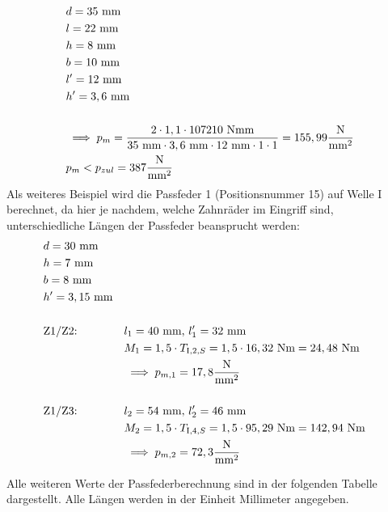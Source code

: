 \begin{itemize}
\begin{align*}
		&d= 35 \text{ mm} \\
		&l= 22 \text{ mm} \\
		&h= 8 \text{ mm} \\
		&b= 10 \text{ mm} \\
		&l'= 12 \text{ mm} \\
		&h'= 3,6 \text{ mm} \\ \\
		&\implies p_m = \frac{2 \cdot 1,1 \cdot 107210 \text{ Nmm}}{35 \text{ mm} \cdot 3,6 \text{ mm} \cdot 12 \text{ mm} \cdot 1 \cdot 1}  = 155,99 \frac{\text{N}}{\text{mm}^2}\\
		& p_m < p_{zul} = 387 \frac{\text{N}}{\text{mm}^2} \\
	\end{align*}
	Als weiteres Beispiel wird die Passfeder 1 (Positionsnummer 15) auf Welle I berechnet, da hier je nachdem, welche Zahnräder im Eingriff sind, unterschiedliche Längen der Passfeder beansprucht werden:
	\begin{align*}
	&d= 30 \text{ mm} &\\
	&h= 7 \text{ mm} &\\
	&b= 8 \text{ mm} &\\
	&h'= 3,15 \text{ mm}& \\ \\
	&\text{Z1/Z2:} &&l_1 = 40 \text{ mm, } l_1' = 32 \text{ mm}\\
	& && M_1 = 1,5 \cdot T_{\mathord{\mathrm{I}},2,S} = 1,5 \cdot 16,32 \text{ Nm} =24,48 \text{ Nm} \\
	& &&\implies p_{m,1} = 17,8\frac{\text{N}}{\text{mm}^2} \\ \\
	&\text{Z1/Z3:} &&l_2 = 54\text{ mm, } l_2' = 46 \text{ mm}\\
	& && M_2 = 1,5 \cdot T_{\mathord{\mathrm{I}},4,S} = 1,5 \cdot 95,29 \text{ Nm} = 142,94 \text{ Nm}\\
	& &&\implies p_{m,2} = 72,3\frac{\text{N}}{\text{mm}^2} \\
	\end{align*}
\end{itemize}
\newpage
Alle weiteren Werte der Passfederberechnung sind in der folgenden Tabelle dargestellt. Alle Längen werden in der Einheit Millimeter angegeben. \\ \\
